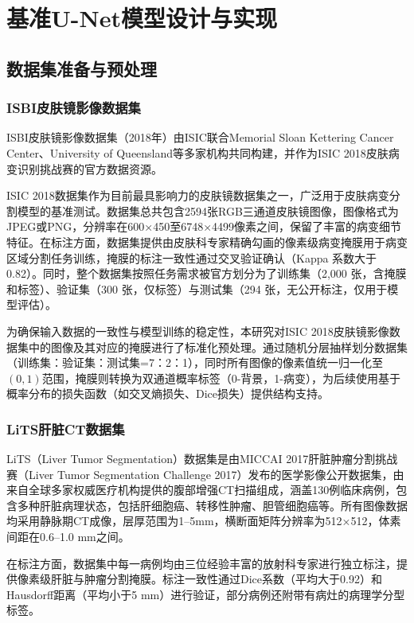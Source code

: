 \section{基准U-Net模型设计与实现}

\subsection{数据集准备与预处理}

\subsubsection{ISBI皮肤镜影像数据集}

ISBI皮肤镜影像数据集（2018年）由ISIC联合Memorial Sloan Kettering Cancer Center、University of Queensland等多家机构共同构建，并作为ISIC 2018皮肤病变识别挑战赛的官方数据资源\cite{codella2019skinlesionanalysismelanoma}。

ISIC 2018数据集作为目前最具影响力的皮肤镜数据集之一，广泛用于皮肤病变分割模型的基准测试。数据集总共包含2594张RGB三通道皮肤镜图像，图像格式为JPEG或PNG，分辨率在600×450至6748×4499像素之间，保留了丰富的病变细节特征。在标注方面，数据集提供由皮肤科专家精确勾画的像素级病变掩膜用于病变区域分割任务训练，掩膜的标注一致性通过交叉验证确认（Kappa 系数大于 0.82）。同时，整个数据集按照任务需求被官方划分为了训练集（2,000 张，含掩膜和标签）、验证集（300 张，仅标签）与测试集（294 张，无公开标注，仅用于模型评估）。

为确保输入数据的一致性与模型训练的稳定性，本研究对ISIC 2018皮肤镜影像数据集中的图像及其对应的掩膜进行了标准化预处理。通过随机分层抽样划分数据集（训练集：验证集：测试集=7：2：1），同时所有图像的像素值统一归一化至$(0,1)$范围，掩膜则转换为双通道概率标签（0-背景，1-病变），为后续使用基于概率分布的损失函数（如交叉熵损失、Dice损失）提供结构支持。

\subsubsection{LiTS肝脏CT数据集}

LiTS（Liver Tumor Segmentation）数据集是由MICCAI 2017肝脏肿瘤分割挑战赛（Liver Tumor Segmentation Challenge 2017）发布的医学影像公开数据集，由来自全球多家权威医疗机构提供的腹部增强CT扫描组成，涵盖130例临床病例，包含多种肝脏病理状态，包括肝细胞癌、转移性肿瘤、胆管细胞癌等\cite{Bilic_2023}。所有图像数据均采用静脉期CT成像，层厚范围为1–5mm，横断面矩阵分辨率为512×512，体素间距在0.6–1.0 mm之间。

在标注方面，数据集中每一病例均由三位经验丰富的放射科专家进行独立标注，提供像素级肝脏与肿瘤分割掩膜。标注一致性通过Dice系数（平均大于0.92）和Hausdorff距离（平均小于5 mm）进行验证，部分病例还附带有病灶的病理学分型标签。

